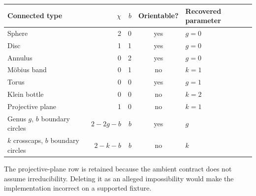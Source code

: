 \begin{center}
\begin{tabular}{lrrcl}
\toprule
Connected type & $\chi$ & $b$ & Orientable? & Recovered parameter\\
\midrule
Sphere & 2 & 0 & yes & $g=0$\\
Disc & 1 & 1 & yes & $g=0$\\
Annulus & 0 & 2 & yes & $g=0$\\
M\"obius band & 0 & 1 & no & $k=1$\\
Torus & 0 & 0 & yes & $g=1$\\
Klein bottle & 0 & 0 & no & $k=2$\\
Projective plane & 1 & 0 & no & $k=1$\\
Genus $g$, $b$ boundary circles & $2-2g-b$ & $b$ & yes & $g$\\
$k$ crosscaps, $b$ boundary circles & $2-k-b$ & $b$ & no & $k$\\
\bottomrule
\end{tabular}
\end{center}

The projective-plane row is retained because the ambient contract does not
assume irreducibility. Deleting it as an alleged impossibility would make
the implementation incorrect on a supported fixture.
